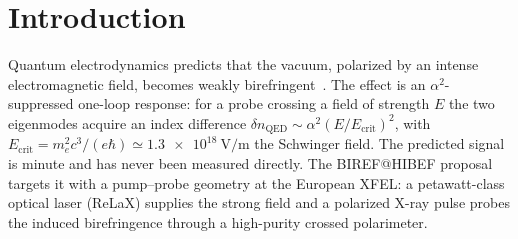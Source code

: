 \documentclass[aps,prd,twocolumn,superscriptaddress,nofootinbib,longbibliography]{revtex4-2}
\newcommand{\Ecrit}{E_{\mathrm{crit}}}
\begin{document}
\maketitle

\section{Introduction}

Quantum electrodynamics predicts that the vacuum, polarized by an intense
electromagnetic field, becomes weakly birefringent~\cite{HeisenbergEuler1936,
Schwinger1951}. The effect is an $\alpha^2$-suppressed one-loop response: for a
probe crossing a field of strength $E$ the two eigenmodes acquire an index
difference $\delta n_{\mathrm{QED}}\sim\alpha^2(E/\Ecrit)^2$, with
$\Ecrit=m_e^2c^3/(e\hbar)\simeq\SI{1.3e18}{\volt\per\meter}$ the Schwinger
field. The predicted signal is minute and has never been measured directly. The
BIREF@HIBEF proposal~\cite{BirefHibefLoI2025} targets it with a pump--probe
geometry at the European XFEL: a petawatt-class optical laser (ReLaX) supplies
the strong field and a polarized X-ray pulse probes the induced birefringence
through a high-purity crossed polarimeter.
\end{document}
